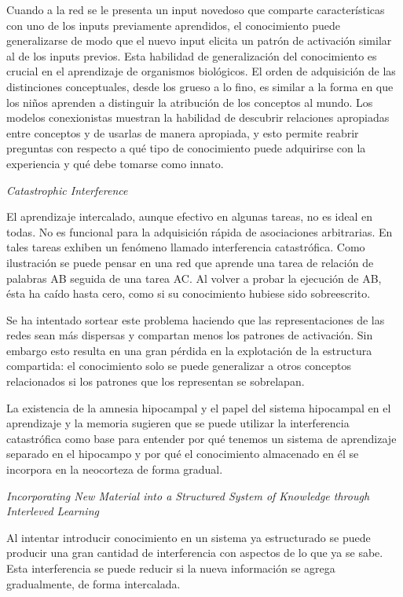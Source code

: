 \documentclass[a4paper,12pt]{article}
\begin{document}
Cuando a la red se le presenta un input novedoso que comparte características con uno de los inputs previamente aprendidos, el conocimiento puede generalizarse de modo que el nuevo input elicita un patrón de activación similar al de los inputs previos. Esta habilidad de generalización del conocimiento es crucial en el aprendizaje de organismos biológicos. El orden de adquisición de las distinciones conceptuales, desde los grueso a lo fino, es similar a la forma en que los niños aprenden a distinguir la atribución de los conceptos al mundo. Los modelos conexionistas muestran la habilidad de descubrir relaciones apropiadas entre conceptos y de usarlas de manera apropiada, y esto permite reabrir preguntas con respecto a qué tipo de conocimiento puede adquirirse con la experiencia y qué debe tomarse como innato.

{\itshape Catastrophic Interference}

El aprendizaje intercalado, aunque efectivo en algunas tareas, no es ideal en todas. No es funcional para la adquisición rápida de asociaciones arbitrarias. En tales tareas exhiben un fenómeno llamado interferencia catastrófica. Como ilustración se puede pensar en una red que aprende una tarea de relación de palabras AB seguida de una tarea AC. Al volver a probar la ejecución de AB, ésta ha caído hasta cero, como si su conocimiento hubiese sido sobreescrito.

Se ha intentado sortear este problema haciendo que las representaciones de las redes sean más dispersas y compartan menos los patrones de activación. Sin embargo esto resulta en una gran pérdida en la explotación de la estructura compartida: el conocimiento solo se puede generalizar a otros conceptos relacionados si los patrones que los representan se sobrelapan. 

La existencia de la amnesia hipocampal y el papel del sistema hipocampal en el aprendizaje y la memoria sugieren que se puede utilizar la interferencia catastrófica como base para entender por qué tenemos un sistema de aprendizaje separado en el hipocampo y por qué el conocimiento almacenado en él se incorpora en la neocorteza de forma gradual.

{\itshape Incorporating New Material into a Structured System of Knowledge through Interleved Learning}

Al intentar introducir conocimiento en un sistema ya estructurado se puede producir una gran cantidad de interferencia con aspectos de lo que ya se sabe. Esta interferencia se puede reducir si la nueva información se agrega gradualmente, de forma intercalada.
\end{document}
